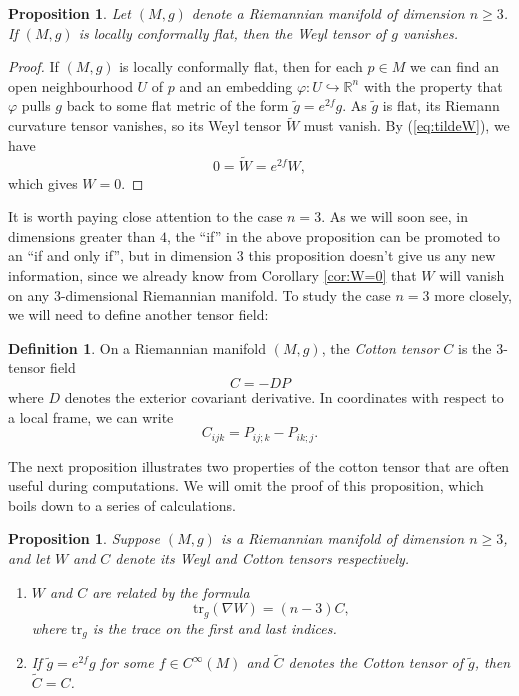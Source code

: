 \documentclass{amsart}
\numberwithin{equation}{section}
\newcommand{\vp}{\varphi}
\newcommand{\R}{\mathbb{R}}
\newcommand{\mono}{\hookrightarrow}
\newcommand{\tr}{\mathrm{tr}}
\theoremstyle{plain}
\newtheorem{prop}[thm]{Proposition}
\theoremstyle{definition}
\newtheorem{defn}[thm]{Definition}
\theoremstyle{remark}
\begin{document}
\begin{prop}\label{prop:conformalW=0}
Let $(M,g)$ denote a Riemannian manifold of dimension $n \ge 3$. If $(M,g)$ is locally conformally flat, then the Weyl tensor of $g$ vanishes.
\end{prop}
\begin{proof}
    If $(M,g)$ is locally conformally flat, then for each $p \in M$ we can find an open neighbourhood $U$ of $p$ and an embedding $\vp: U \mono \R^n$ with the property that $\vp$ pulls $g$ back to some flat metric of the form $\tilde{g} = e^{2f}g$. As $\tilde{g}$ is flat, its Riemann curvature tensor vanishes, so its Weyl tensor $\widetilde{W}$ must vanish. By (\ref{eq:tildeW}), we have 
    \[0=\tilde{W} = e^{2f}W,\]
    which gives $W =0$.
\end{proof}
It is worth paying close attention to the case $n = 3$. As we will soon see, in dimensions greater than $4$, the ``if'' in the above proposition can be promoted to an ``if and only if'', but in dimension $3$ this proposition doesn't give us any new information, since we already know from Corollary \ref{cor:W=0} that $W$ will vanish on any $3$-dimensional Riemannian manifold. To study the case $n=3$ more closely, we will need to define another tensor field:
\begin{defn}
    On a Riemannian manifold $(M,g)$, the \emph{Cotton tensor} $C$ is the $3$-tensor field 
    \begin{equation}\label{eq:C}C = -DP\end{equation}
    where $D$ denotes the exterior covariant derivative. In coordinates with respect to a local frame, we can write
    \begin{equation}\label{eq:Cijk}C_{ijk} = P_{ij;k} - P_{ik;j}.\end{equation}
\end{defn} 
The next proposition illustrates two properties of the cotton tensor that are often useful during computations. We will omit the proof of this proposition, which boils down to a series of calculations. 
\begin{prop}\label{prop:CProperties}
Suppose $(M, g)$ is a Riemannian manifold of dimension $n \ge 3$, and let $W$ and $C$ denote its Weyl and Cotton tensors respectively. 
\begin{enumerate}
    \item \label{prop:CProperties1} $W$ and $C$ are related by the formula 
\begin{equation}    
    \tr_g(\nabla W) = (n-3)C,
\end{equation}
where $\tr_g$ is the trace on the first and last indices.
\item \label{prop:CProperties2} If $\tilde{g} = e^{2f}g$ for some $f \in C^\infty(M)$ and $\tilde{C}$ denotes the Cotton tensor of $\widetilde{g}$, then $\widetilde{C} = C$.
\end{enumerate}
\end{prop}
\end{document}
